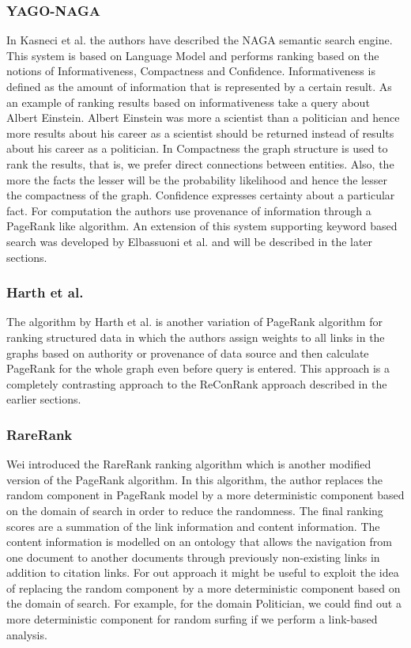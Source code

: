 \documentclass{article}
\begin{document}
    \subsubsection{YAGO-NAGA}
    In Kasneci et al.\cite{kasneci08} the authors have described the NAGA semantic search engine. This system is based on Language Model and performs ranking based on the notions of Informativeness, Compactness and Confidence. Informativeness is defined as the amount of information that is represented by a certain result. As an example of ranking results based on informativeness take a query about Albert Einstein. Albert Einstein was more a scientist than a politician and hence more results about his career as a scientist should be returned instead of results about his career as a politician. In Compactness the graph structure is used to rank the results, that is, we prefer direct connections between entities. Also, the more the facts the lesser will be the probability likelihood and hence the lesser the compactness of the graph. Confidence expresses certainty about a particular fact. For computation the authors use provenance of information through a PageRank like algorithm. An extension of this system supporting keyword based search was developed by Elbassuoni et al.\cite{elbassuoni08} and will be described in the later sections.

    \subsubsection{Harth et al.}
    The algorithm by Harth et al.\cite{harth09} is another variation of PageRank algorithm for ranking structured data in which the authors assign weights to all links in the graphs based on authority or provenance of data source and then calculate PageRank for the whole graph even before query is entered. This approach is a completely contrasting approach to the ReConRank approach\cite{hogan06} described in the earlier sections.

    \subsubsection{RareRank}
    Wei\cite{wei09} introduced the RareRank ranking algorithm which is another modified version of the PageRank algorithm. In this algorithm, the author replaces the random component in PageRank model by a more deterministic component based on the domain of search in order to reduce the randomness. The final ranking scores are a summation of the link information and content information. The content information is modelled on an ontology that allows the navigation from one document to another documents through previously non-existing links in addition to citation links. For out approach it might be useful to exploit the idea of replacing the random component by a more deterministic component based on the domain of search. For example, for the domain Politician, we could find out a more deterministic component for random surfing if we perform a link-based analysis.
\end{document}
